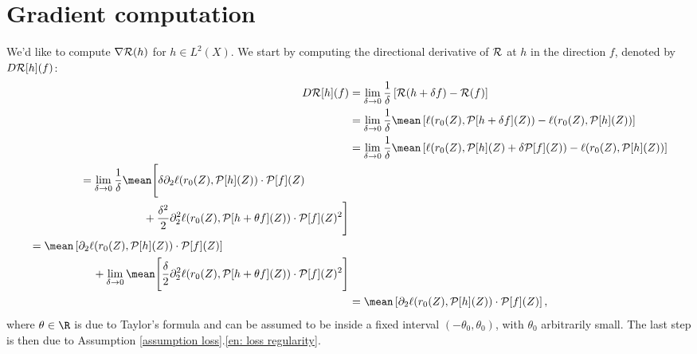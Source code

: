 \section{Gradient computation}

We'd like to compute $ \nabla \mathcal{R} ( h ) $ for $ h \in L^{ 2 } ( X ) $.
We start by computing the directional derivative of $ \mathcal{R} $ at $ h $ in the direction $ f $, denoted by $ D \mathcal{R} [ h ] ( f ) $:
\begin{align*}
    D \risk [ h ] ( f )
    &= \lim\limits_{ \delta \to 0 } \frac{ 1 }{ \delta } \left[
        \risk ( h + \delta f ) - \risk ( f )
    \right] \\
    &= \lim\limits_{ \delta \to 0 } \frac{ 1 }{ \delta } \mean \left[
        \ell ( r_{ 0 } ( Z ), \meanop [ h + \delta f ] ( Z ) )
        -
        \ell ( r_{ 0 } ( Z ), \meanop [ h ] ( Z ) )
    \right] \\
    &= \lim\limits_{ \delta \to 0 } \frac{ 1 }{ \delta } \mean \left[
        \ell ( r_{ 0 } ( Z ), \meanop [ h ] ( Z ) + \delta \meanop [ f ] ( Z ) )
        -
        \ell ( r_{ 0 } ( Z ), \meanop [ h ] ( Z ) )
    \right] \\
    \begin{split}
        &= \lim\limits_{ \delta \to 0 } \frac{ 1 }{ \delta } \mean \Biggl[
            \delta \partial_{ 2 } \ell ( r_{ 0 } ( Z ), \meanop [ h ] ( Z ) ) \cdot \meanop [ f ] ( Z ) \\
        &\hspace{2cm}+ \frac{ \delta^2 }{ 2 } \partial_{ 2 }^2 \ell ( r_{ 0 } ( Z ) , \meanop [ h + \theta f ] ( Z ) ) \cdot \meanop [ f ] ( Z )^2
        \Biggr]
    \end{split} \\
    \begin{split}
        &= \mean \left[
            \partial_{ 2 } \ell ( r_{ 0 } ( Z ), \meanop [ h ] ( Z ) ) \cdot \meanop [ f ] ( Z )
        \right] \\
        &\hspace{2cm}+ \lim\limits_{ \delta \to 0 } \mean \Biggl[
            \frac{ \delta }{ 2 } \partial_{ 2 }^2 \ell ( r_{ 0 } ( Z ) , \meanop [ h + \theta f ] ( Z ) ) \cdot \meanop [ f ] ( Z )^2
        \Biggr]
    \end{split} \\
    &= \mean \left[
        \partial_{ 2 } \ell ( r_{ 0 } ( Z ), \meanop [ h ] ( Z ) ) \cdot \meanop [ f ] ( Z )
    \right]
,\end{align*}
where $ \theta \in \R $ is due to Taylor's formula and can be assumed to be inside a fixed interval $ ( -\theta_{ 0 }, \theta_{ 0 } ) $, with $ \theta_{ 0 } $ arbitrarily small.
The last step is then due to Assumption \ref{assumption loss}.\ref{en: loss regularity}.

